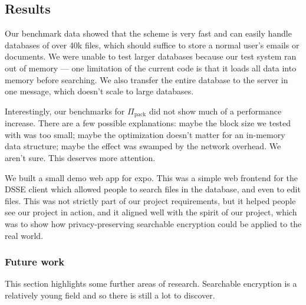 \subsection{Results}


Our benchmark data showed that the scheme is very fast and can easily handle databases of over 40k files, which should suffice to store a normal user's emails or documents. We were unable to test larger databases because our test system ran out of memory --- one limitation of the current code is that it loads all data into memory before searching. We also transfer the entire database to the server in one message, which doesn't scale to large databases.

Interestingly, our benchmarks for $\Pi_\mathrm{pack}$ did not show much of a performance increase. There are a few possible explanations: maybe the block size we tested with was too small; maybe the optimization doesn't matter for an in-memory data structure; maybe the effect was swamped by the network overhead. We aren't sure. This deserves more attention.

We built a small demo web app for expo. This was a simple web frontend for the DSSE client which allowed people to search files in the database, and even to edit files. This was not strictly part of our project requirements, but it helped people see our project in action, and it aligned well with the spirit of our project, which was to show how privacy-preserving searchable encryption could be applied to the real world.

\subsubsection{Future work}

This section highlights some further areas of research. 
Searchable encryption is a relatively young field and so there is still a lot to discover.

